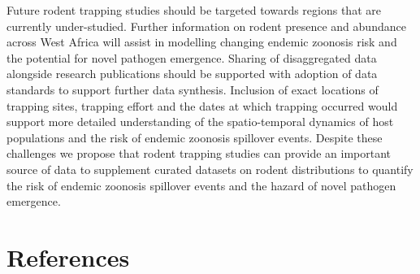 \documentclass[
]{article}
\begin{document}
Future rodent trapping studies should be targeted towards regions that
are currently under-studied. Further information on rodent presence and
abundance across West Africa will assist in modelling changing endemic
zoonosis risk and the potential for novel pathogen emergence. Sharing of
disaggregated data alongside research publications should be supported
with adoption of data standards to support further data synthesis.
Inclusion of exact locations of trapping sites, trapping effort and the
dates at which trapping occurred would support more detailed
understanding of the spatio-temporal dynamics of host populations and
the risk of endemic zoonosis spillover events. Despite these challenges
we propose that rodent trapping studies can provide an important source
of data to supplement curated datasets on rodent distributions to
quantify the risk of endemic zoonosis spillover events and the hazard of
novel pathogen emergence.

\hypertarget{references}{%
\section{References}\label{references}}
\end{document}
